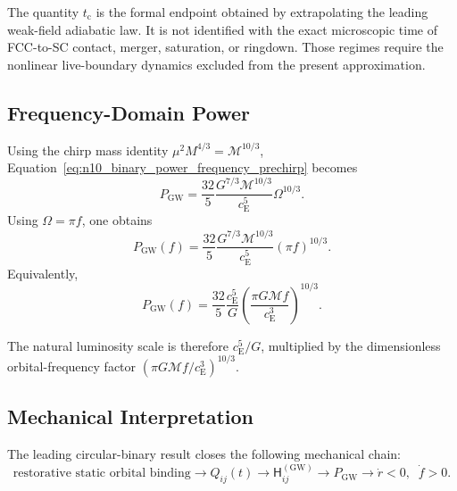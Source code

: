 The quantity $t_{\mathrm{c}}$ is the formal endpoint obtained by extrapolating the leading weak-field adiabatic law. It is not identified with the exact microscopic time of FCC-to-SC contact, merger, saturation, or ringdown. Those regimes require the nonlinear live-boundary dynamics excluded from the present approximation.

\subsection{Frequency-Domain Power}
\label{subsec:n10_frequency_domain_power}

Using the chirp mass identity $\mu^{2}M^{4/3} = \mathcal{M}^{10/3}$, Equation~\eqref{eq:n10_binary_power_frequency_prechirp} becomes
\begin{equation}
    P_{\mathrm{GW}} = \frac{32}{5} \frac{ G^{7/3}\mathcal{M}^{10/3} }{ c_{\mathrm{E}}^{5} } \Omega^{10/3}.
\end{equation}
Using $\Omega = \pi f$, one obtains
\begin{equation}
    P_{\mathrm{GW}}(f) = \frac{32}{5} \frac{ G^{7/3}\mathcal{M}^{10/3} }{ c_{\mathrm{E}}^{5} } \left( \pi f \right)^{10/3}.
    \label{eq:n10_frequency_domain_power}
\end{equation}
Equivalently,
\begin{equation}
    P_{\mathrm{GW}}(f) = \frac{32}{5} \frac{ c_{\mathrm{E}}^{5} }{ G } \left( \frac{ \pi G\mathcal{M}f }{ c_{\mathrm{E}}^{3} } \right)^{10/3}.
    \label{eq:n10_dimensionless_frequency_power}
\end{equation}

The natural luminosity scale is therefore $c_{\mathrm{E}}^{5}/G$, multiplied by the dimensionless orbital-frequency factor $\left( \pi G\mathcal{M}f / c_{\mathrm{E}}^{3} \right)^{10/3}$.

\subsection{Mechanical Interpretation}
\label{subsec:n10_mechanical_interpretation}

The leading circular-binary result closes the following mechanical chain:
\begin{equation}
    \text{restorative static orbital binding} \longrightarrow Q_{ij}(t) \longrightarrow \mathsf{H}_{ij}^{(\mathrm{GW})} \longrightarrow P_{\mathrm{GW}} \longrightarrow \dot{r}<0, \;\; \dot{f}>0.
\end{equation}

